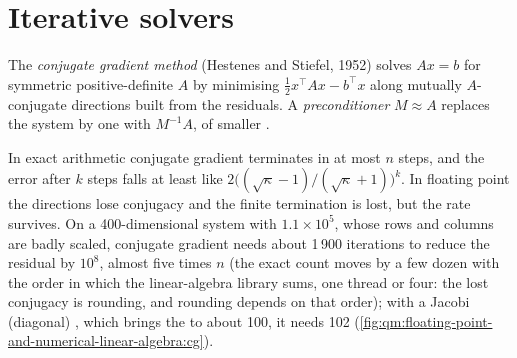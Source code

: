 \section{Iterative solvers}

\begin{definition}\label{def:qm:floating-point-and-numerical-linear-algebra:cg}
The \emph{conjugate gradient method} (Hestenes and Stiefel, 1952) solves $Ax = b$ for symmetric positive-definite $A$ by minimising $\frac12x^\top Ax - b^\top x$ along
mutually $A$-conjugate directions built from the residuals. A \emph{preconditioner} $M \approx A$ replaces the system by one with $M^{-1}A$, of smaller .
\end{definition}

In exact arithmetic conjugate gradient terminates in at most $n$ steps, and the error after $k$ steps falls at least like $2\bigl((\sqrt\kappa - 1)/(\sqrt\kappa + 1)\bigr)^k$. In floating point the
directions lose conjugacy and the finite termination is lost, but the rate survives. On a 400-dimensional system with  $1.1 \times 10^5$, whose rows and columns are badly
scaled, conjugate gradient needs about 1\,900 iterations to reduce the residual by $10^8$, almost five times $n$ (the exact count moves by a few dozen with the order in which the linear-algebra library sums, one thread or four: the lost conjugacy is rounding, and rounding depends on that order); with a Jacobi (diagonal) , which brings the  to about
100, it needs 102 (\cref{fig:qm:floating-point-and-numerical-linear-algebra:cg}).

